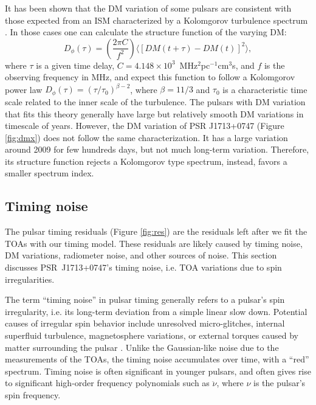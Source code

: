It has been shown that the DM variation of some pulsars are consistent with
those expected from an ISM characterized by a Kolomgorov turbulence spectrum
\citep{ric90, ktr94, yhc+07, kcs+13, fst14}. In those cases one can calculate the 
structure function of the varying DM: 
\begin{equation}
D_{\phi}(\tau)=\left(\frac{2\pi C}{f^2}\right)\langle [DM(t+\tau)-DM(t)]^2\rangle, 
\end{equation}
where $\tau$ 
is a given time delay, $C=4.148\times10^3$~MHz$^2$pc$^{-1}$cm$^3$s, and $f$ is 
the observing frequency in MHz, and expect 
this function to follow a Kolomgorov power law $D_{\phi}(\tau)=(\tau/\tau_0)^{\beta -2}$, 
where $\beta=11/3$ and $\tau_0$ is a characteristic time scale related to 
the inner scale of the turbulence. The pulsars with DM variation that fits this
theory generally have large but relatively smooth DM variations in timescale of 
years. However, the DM variation of PSR J1713+0747 (Figure \ref{fig:dmx}) does not 
follow the same characterization. It has a large variation around 2009 for few hundreds days,
but not much long-term variation. Therefore, its structure function rejects
a Kolomgorov type spectrum, instead, favors a smaller spectrum index.



\subsection{Timing noise}
\label{sec:noise}
The pulsar timing residuals (Figure \ref{fig:res}) are the residuals left
after we fit the TOAs with our timing model. 
These residuals are likely caused by timing noise, DM variations, radiometer 
noise, and other sources of noise. This section discusses PSR~J1713+0747's
timing noise, i.e. TOA variations due to spin irregularities.

The term ``timing noise'' in pulsar timing generally refers to a pulsar's spin
irregularity, i.e. its long-term deviation from a simple linear slow down. 
Potential causes of irregular spin behavior include unresolved
micro-glitches, internal superfluid turbulence, magnetosphere variations, or external torques caused by matter surrounding the pulsar
\citep{hlk10, ymh+13, ml14}.
Unlike the Gaussian-like noise due to the measurements of the TOAs, the
timing noise accumulates over time, with a ``red'' 
spectrum. Timing noise is often significant in younger pulsars, and often
gives rise to significant high-order frequency polynomials such as
$\ddot{\nu}$, where $\nu$ is the pulsar's spin frequency.

